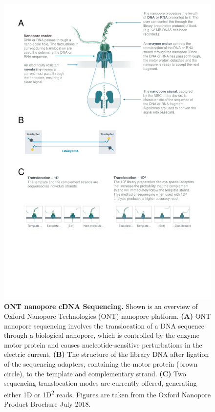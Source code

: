 \begin{figure}[]
	\centering
	\includegraphics[page=1,trim={0 6cm 0 0 },clip, scale = 0.8]{Figures/ProjectDevelopment_FiguresONT}
	\captionsetup{width=0.95\textwidth}
	\caption[ONT nanopore cDNA Sequencing]%
	{\textbf{ONT nanopore cDNA Sequencing.} Shown is an overview of Oxford Nanopore Technologies (ONT) nanopore platform. \textbf{(A)} ONT nanopore sequencing involves the translocation of a DNA sequence through a biological nanopore, which is controlled by the enzyme motor protein and causes nucleotide-sensitive perturbations in the electric current. \textbf{(B)} The structure of the library DNA after ligation of the sequencing adapters, containing the motor protein (brown circle), to the template and complementary strand. \textbf{(C)} Two sequencing translocation modes are currently offered, generating either 1D or 1D\textsuperscript{2} reads. Figures are taken from the Oxford Nanopore Product Brochure July 2018.}
	\label{fig:ONT_Mechanism}
\end{figure}

